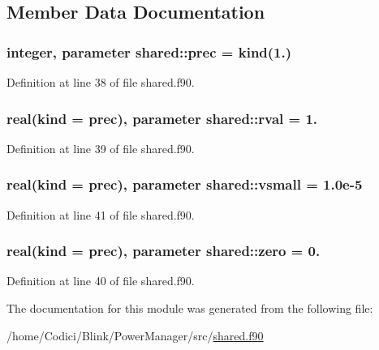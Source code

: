 \subsection{Member Data Documentation}
\hypertarget{classshared_a6d09f77f416c87d20c860fa9ee67f043}{
\subsubsection[{prec}]{\setlength{\rightskip}{0pt plus 5cm}integer, parameter shared\-::prec = kind(1.)}}\label{classshared_a6d09f77f416c87d20c860fa9ee67f043}


Definition at line 38 of file shared.\-f90.

\hypertarget{classshared_a1e6d2e57c52bc7d2d6e76ff50759bb36}{
\subsubsection[{rval}]{\setlength{\rightskip}{0pt plus 5cm}real(kind = {\bf prec}), parameter shared\-::rval = 1.}}\label{classshared_a1e6d2e57c52bc7d2d6e76ff50759bb36}


Definition at line 39 of file shared.\-f90.

\hypertarget{classshared_a783df489735fa6181ea5fae3d6be8726}{
\subsubsection[{vsmall}]{\setlength{\rightskip}{0pt plus 5cm}real(kind = {\bf prec}), parameter shared\-::vsmall = 1.\-0e-\/5}}\label{classshared_a783df489735fa6181ea5fae3d6be8726}


Definition at line 41 of file shared.\-f90.

\hypertarget{classshared_a12330d78292ab20be87d5801140eaef0}{
\subsubsection[{zero}]{\setlength{\rightskip}{0pt plus 5cm}real(kind = {\bf prec}), parameter shared\-::zero = 0.}}\label{classshared_a12330d78292ab20be87d5801140eaef0}


Definition at line 40 of file shared.\-f90.



The documentation for this module was generated from the following file\-:\begin{DoxyCompactItemize}
\item 
/home/\-Codici/\-Blink/\-Power\-Manager/src/\hyperlink{shared_8f90}{shared.\-f90}\end{DoxyCompactItemize}

